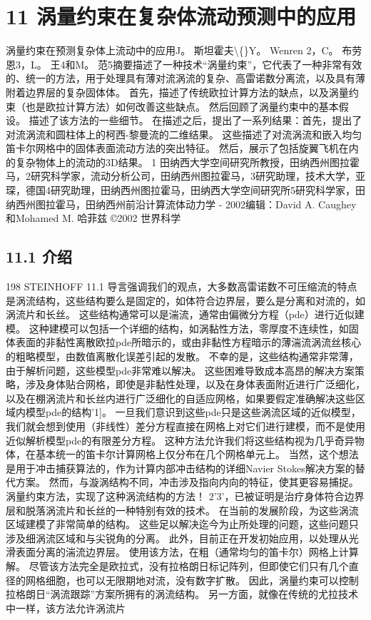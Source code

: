 \documentclass[UTF8,11pt,a4paper,openany,fontset=fandol]{ctexbook}
\begin{document}
\clearpage
\chapter{11 涡量约束在复杂体流动预测中的应用}
涡量约束在预测复杂体上流动中的应用J。 斯坦霍夫\textbackslash\{\}Y。 Wenren 2，C。 布劳恩3，L。 王4和M。 范5摘要描述了一种技术“涡量约束”，它代表了一种非常有效的、统一的方法，用于处理具有薄对流涡流的复杂、高雷诺数分离流，以及具有薄附着边界层的复杂固体体。 首先，描述了传统欧拉计算方法的缺点，以及涡量约束（也是欧拉计算方法）如何改善这些缺点。 然后回顾了涡量约束中的基本假设。 描述了该方法的一些细节。 在描述之后，提出了一系列结果：首先，提出了对流涡流和圆柱体上的柯西-黎曼流的二维结果。 这些描述了对流涡流和嵌入均匀笛卡尔网格中的固体表面流动方法的突出特征。 然后，展示了包括旋翼飞机在内的复杂物体上的流动的3D结果。 1 田纳西大学空间研究所教授，田纳西州图拉霍马，2研究科学家，流动分析公司，田纳西州图拉霍马，3研究助理，技术大学，亚琛，德国4研究助理，田纳西州图拉霍马，田纳西大学空间研究所5研究科学家，田纳西州图拉霍马，田纳西州前沿计算流体动力学 - 2002编辑：David A. Caughey和Mohamed M. 哈菲兹 ©2002 世界科学

\section{11.1 介绍}
198 STEINHOFF 11.1 导言强调我们的观点，大多数高雷诺数不可压缩流的特点是涡流结构，这些结构要么是固定的，如体符合边界层，要么是分离和对流的，如涡流片和长丝。 这些结构通常可以是湍流，通常由偏微分方程（pde）进行近似建模。 这种建模可以包括一个详细的结构，如涡黏性方法，零厚度不连续性，如固体表面的非黏性离散欧拉pde所暗示的，或由非黏性方程暗示的薄湍流涡流丝核心的粗略模型，由数值离散化误差引起的发散。 不幸的是，这些结构通常非常薄，由于解析问题，这些模型pde非常难以解决。 这些困难导致成本高昂的解决方案策略，涉及身体贴合网格，即使是非黏性处理，以及在身体表面附近进行广泛细化，以及在棚涡流片和长丝内进行广泛细化的自适应网格，如果要假定准确解决这些区域内模型pde的结构'1]。 一旦我们意识到这些pde只是这些涡流区域的近似模型，我们就会想到使用（非线性）差分方程直接在网格上对它们进行建模，而不是使用近似解析模型pde的有限差分方程。 这种方法允许我们将这些结构视为几乎奇异物体，在基本统一的笛卡尔计算网格上仅分布在几个网格单元上。 当然，这个想法是用于冲击捕获算法的，作为计算内部冲击结构的详细Navier Stokes解决方案的替代方案。 然而，与漩涡结构不同，冲击涉及指向内向的特征，使其更容易捕捉。 涡量约束方法，实现了这种涡流结构的方法！ 2'3'，已被证明是治疗身体符合边界层和脱落涡流片和长丝的一种特别有效的技术。 在当前的发展阶段，为这些涡流区域建模了非常简单的结构。 这些足以解决迄今为止所处理的问题，这些问题只涉及细涡流区域和与尖锐角的分离。 此外，目前正在开发初始应用，以处理从光滑表面分离的湍流边界层。 使用该方法，在粗（通常均匀的笛卡尔）网格上计算解。 尽管该方法完全是欧拉式，没有拉格朗日标记阵列，但即使它们只有几个直径的网格细胞，也可以无限期地对流，没有数字扩散。 因此，涡量约束可以控制拉格朗日“涡流跟踪”方案所拥有的涡流结构。 另一方面，就像在传统的尤拉技术中一样，该方法允许涡流片
\end{document}

